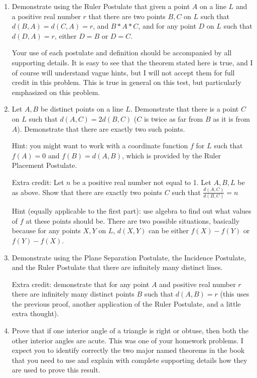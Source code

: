 \documentclass[12pt]{article}
\begin{document}
\begin{enumerate}

\item  Demonstrate using the Ruler Postulate  that given a point $A$ on a line $L$ and a positive real number $r$ that there are two points $B,C$ on $L$ such that
$d(B,A) = d(C,A) = r$, and $B*A*C$, and for any point $D$ on $L$ such that $d(D,A)=r$, either $D=B$ or $D=C$.

Your use of each postulate and definition should be accompanied by all supporting details.  It is easy to see that the theorem stated here is true, and I of course will understand vague hints, but I will not accept them for full credit in this problem.  This is true in general on this test, but particularly emphasized on this problem.

\item  Let $A,B$ be distinct points on a line $L$.   Demonstrate that there is a point $C$ on $L$ such that $d(A,C) = 2d(B,C)$ ($C$ is twice as far from $B$ as it is from $A$).  Demonstrate that there are exactly two such points.

Hint:  you might want to work with a coordinate function $f$ for $L$ such that $f(A)=0$ and $f(B)=d(A,B)$, which is provided by the Ruler Placement Postulate.

Extra credit:  Let $n$ be a positive real number not equal to 1.  Let $A,B,L$ be as above.  Show that there are exactly two points $C$ such that $\frac{d(A,C)}{d(B,C)} = n$

Hint (equally applicable to the first part):  use algebra to find out what values of $f$ at these points should be.  There are two possible situations, basically because for any points $X,Y$ on $L$, $d(X,Y)$ can be either $f(X)-f(Y)$ or $f(Y)-f(X)$.

\item  Demonstrate using the Plane Separation Postulate, the Incidence Postulate, and the Ruler Postulate that there are infinitely many distinct lines.

Extra credit: demonstrate that for any point $A$ and positive real number $r$ there are infinitely many distinct points $B$ such that $d(A,B)= r$ (this uses the previous proof, another application of the Ruler Postulate, and a little extra thought).

\item Prove that if one interior angle of a triangle is right or obtuse, then both the other interior angles are acute.  This was one of your homework problems.  I expect you to identify correctly the two major named theorems in the book that you need to use and explain with complete supporting details how they are used to prove this result.


\end{enumerate}
\end{document}
